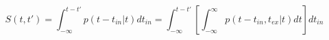 \begin{equation}
S(t,t') = \int_{-\infty}^{t-t'} p(t-t_{in}|t) dt_{in} = \int_{-\infty}^{t-t'} \left[ \int_{-\infty}^\infty p(t-t_{in},t_{ex}|t) dt\right] dt_{in}
\end{equation}